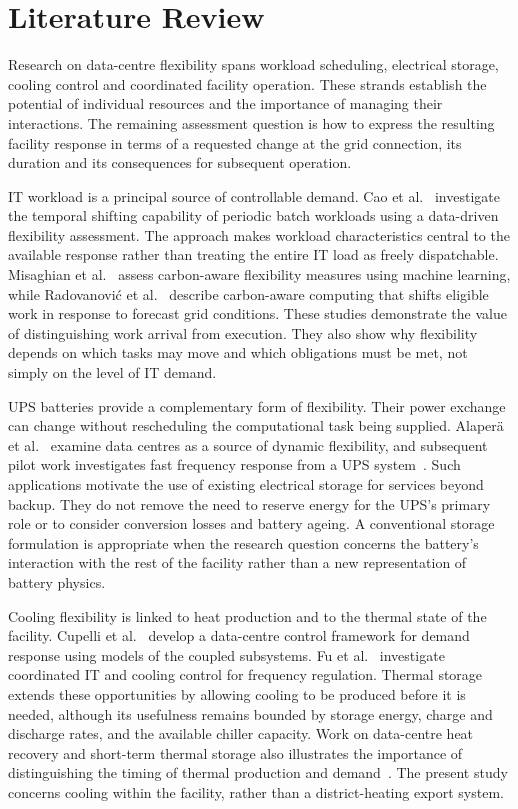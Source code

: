 \section{Literature Review}
\label{sec:literature}
Research on data-centre flexibility spans workload scheduling, electrical storage, cooling control and coordinated facility operation. These strands establish the potential of individual resources and the importance of managing their interactions. The remaining assessment question is how to express the resulting facility response in terms of a requested change at the grid connection, its duration and its consequences for subsequent operation.

IT workload is a principal source of controllable demand. Cao et al.~\cite{Cao2022ApEn} investigate the temporal shifting capability of periodic batch workloads using a data-driven flexibility assessment. The approach makes workload characteristics central to the available response rather than treating the entire IT load as freely dispatchable. Misaghian et al.~\cite{Misaghian2023TIA} assess carbon-aware flexibility measures using machine learning, while Radovanovi\'c et al.~\cite{radovanovic2022carbon} describe carbon-aware computing that shifts eligible work in response to forecast grid conditions. These studies demonstrate the value of distinguishing work arrival from execution. They also show why flexibility depends on which tasks may move and which obligations must be met, not simply on the level of IT demand.

UPS batteries provide a complementary form of flexibility. Their power exchange can change without rescheduling the computational task being supplied. Alaper\"a et al.~\cite{alapera2018data} examine data centres as a source of dynamic flexibility, and subsequent pilot work investigates fast frequency response from a UPS system~\cite{alapera2019fast}. Such applications motivate the use of existing electrical storage for services beyond backup. They do not remove the need to reserve energy for the UPS's primary role or to consider conversion losses and battery ageing. A conventional storage formulation is appropriate when the research question concerns the battery's interaction with the rest of the facility rather than a new representation of battery physics.

Cooling flexibility is linked to heat production and to the thermal state of the facility. Cupelli et al.~\cite{cupelli2018data} develop a data-centre control framework for demand response using models of the coupled subsystems. Fu et al.~\cite{Fu2020ApEn} investigate coordinated IT and cooling control for frequency regulation. Thermal storage extends these opportunities by allowing cooling to be produced before it is needed, although its usefulness remains bounded by storage energy, charge and discharge rates, and the available chiller capacity. Work on data-centre heat recovery and short-term thermal storage also illustrates the importance of distinguishing the timing of thermal production and demand~\cite{du2025new}. The present study concerns cooling within the facility, rather than a district-heating export system.

